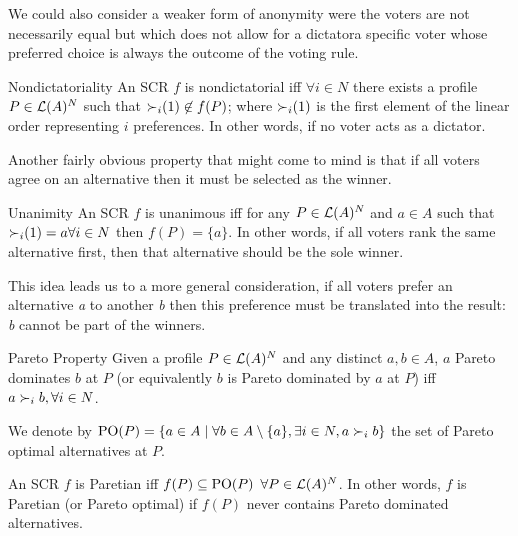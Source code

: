 	We could also consider a weaker form of anonymity were the voters are not necessarily equal but which does not allow for a dictator\textemdash a specific voter whose preferred choice is always the outcome of the voting rule. 

	\begin{genthm}{Nondictatoriality}
	An \acs{SCR} $f$ is nondictatorial iff $\forall i \in N$ there exists a profile $P \in\mathcal{L}(A)^{N}$ such that $\mathbin{\prefi}(1) \not\in f(P)$; where $\mathbin{\prefi}(1)$ is the first element of the linear order representing $i$ preferences. In other words, if no voter acts as a dictator.
	\end{genthm}


	Another fairly obvious property that might come to mind is that if all voters agree on an alternative then it must be selected as the winner.
	
	\begin{genthm}{Unanimity}
	An \acs{SCR} $f$ is unanimous iff for any $P\in\mathcal{L}(A)^{N}$ and $a \in A$ such that $\mathbin{\prefi}(1)=a \forall i \in N$ then $f(P)=\{a\}$. In other words, if all voters rank the same alternative first, then that alternative should be the sole winner.	
	\end{genthm}

	This idea leads us to a more general consideration, if all voters prefer an alternative \textit{a} to another \textit{b} then this preference must be translated into the result: \textit{b} cannot be part of the winners.

	\begin{genthm}{Pareto Property}
	Given a profile $P\in\mathcal{L}(A)^{N}$ and any distinct $a,b\in A$, $a$ Pareto dominates $b$ at $P$ (or equivalently $b$ is Pareto dominated by $a$ at $P$) iff $a \prefi b,\forall i\in N$.
	
	We denote by $\paretopt(P)= \set{a \in A \suchthat \forall b \in A\setminus\{a\}, \exists i \in N, a \pref_i b}$ the set of Pareto optimal alternatives at $P$.
	
	An \acs{SCR} $f$ is Paretian iff $f(P)\subseteq\text{PO}(P)$ $\forall P\in\mathcal{L}(A)^{N}$. In other words, $f$ is Paretian (or Pareto optimal) if $f(P)$ never contains Pareto dominated alternatives.	
	\end{genthm}

